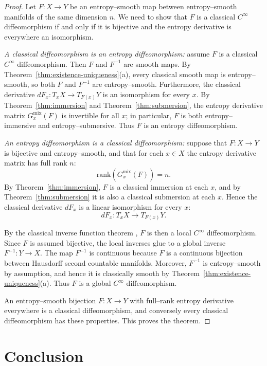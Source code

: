 \documentclass[11pt]{amsart}
\theoremstyle{definition}
\theoremstyle{remark}
\begin{document}
\begin{proof}
Let $F:X\to Y$ be an entropy--smooth map between entropy--smooth manifolds of the 
same dimension $n$.  We need to show that $F$ is a classical $C^\infty$ 
diffeomorphism if and only if it is bijective and the entropy derivative is 
everywhere an isomorphism.

\emph{A classical diffeomorphism is an entropy diffeomorphism:} assume $F$ is a classical $C^\infty$ diffeomorphism.  
Then $F$ and $F^{-1}$ are smooth maps.  
By Theorem~\ref{thm:existence-uniqueness}(a), every classical smooth map is entropy--smooth, so both $F$ and $F^{-1}$ 
are entropy--smooth.  
Furthermore, the classical derivative $dF_x:T_xX\to T_{F(x)}Y$ is an isomorphism 
for every $x$.  
By Theorem~\ref{thm:immersion} and Theorem~\ref{thm:submersion}, the entropy derivative matrix $G_x^{\mathrm{mix}}(F)$ 
is invertible for all $x$; in particular, $F$ is both entropy--immersive and 
entropy--submersive.  
Thus $F$ is an entropy diffeomorphism.

\emph{An entropy diffeomorphism is a classical diffeomorphism:} suppose that $F:X\to Y$ is bijective and entropy--smooth, and that for each 
$x\in X$ the entropy derivative matrix has full rank $n$:
\[
\mathrm{rank}(G_x^{\mathrm{mix}}(F))=n.
\]
By Theorem~\ref{thm:immersion}, $F$ is a classical immersion at each $x$, and by 
Theorem~\ref{thm:submersion} it is also a classical submersion at each $x$.  
Hence the classical derivative $dF_x$ is a linear isomorphism for every $x$:
\[
dF_x:T_xX \longrightarrow T_{F(x)}Y.
\]

By the classical inverse function theorem \cite{lee2013smooth}, $F$ is then a local $C^\infty$ 
diffeomorphism.  
Since $F$ is assumed bijective, the local inverses glue to a global inverse 
$F^{-1}:Y\to X$.  
The map $F^{-1}$ is continuous because $F$ is a continuous bijection between 
Hausdorff second countable manifolds.  
Moreover, $F^{-1}$ is entropy--smooth by assumption, and hence it is classically 
smooth by Theorem~\ref{thm:existence-uniqueness}(a).  
Thus $F$ is a global $C^\infty$ diffeomorphism.

An entropy--smooth bijection $F:X\to Y$ with full--rank entropy derivative 
everywhere is a classical diffeomorphism, and conversely every classical 
diffeomorphism has these properties.  
This proves the theorem.
\end{proof}

\section{Conclusion}
\end{document}
